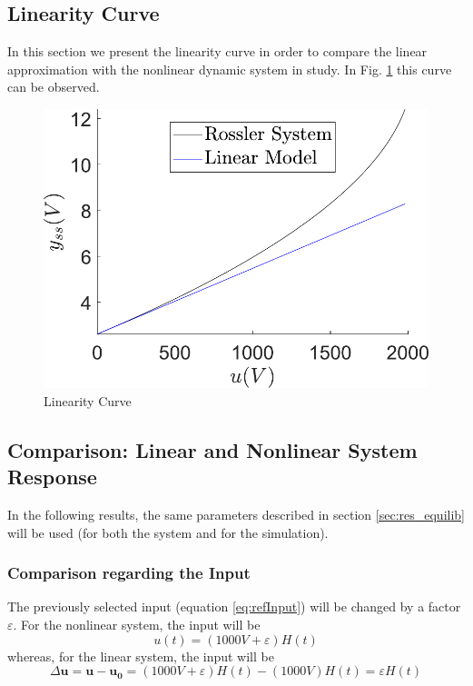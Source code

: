 \subsection{Linearity Curve}\label{sec:linearityCurve}
In this section we present the linearity curve in order to compare the linear approximation with the nonlinear dynamic system in study. In Fig. \ref{fig:linearityCurve} this curve can be observed.

\begin{figure}[H]
    \centering
    \includegraphics[scale=0.5]{figs/curvaLinealidad.pdf}
    \caption{Linearity Curve}
    \label{fig:linearityCurve}
\end{figure}


\subsection{Comparison: Linear and Nonlinear System Response}\label{sec:compar_LinearNonlinear}
In the following results, the same parameters described in section \ref{sec:res_equilib} will be used (for both the system and for the simulation).
\subsubsection{Comparison regarding the Input}
The previously selected input (equation \ref{eq:refInput}) will be changed by a factor $\varepsilon$. For the nonlinear system, the input will be 
\begin{equation*}
    u(t)=(1000V + \varepsilon)H(t)
\end{equation*}
whereas, for the linear system, the input will be
\begin{equation*}
    \Delta \mathbf{u}=\mathbf{u}-\mathbf{u_0}=(1000V + \varepsilon)H(t) - (1000V)H(t) = \varepsilon H(t)
\end{equation*}

